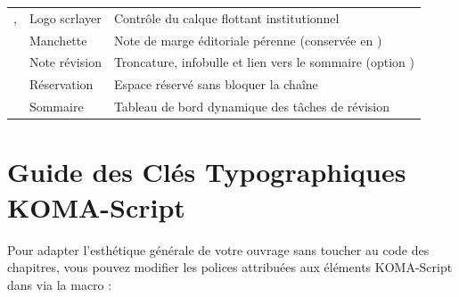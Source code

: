\begin{table}[htbp]
\begin{tabularx}{\textwidth}{@{} l l Y @{}}
    ,  & Logo scrlayer & Contrôle du calque flottant institutionnel \\
     & Manchette & Note de marge éditoriale pérenne (conservée en ) \\
     & Note révision & Troncature, infobulle et lien vers le sommaire (option ) \\
     & Réservation & Espace réservé sans bloquer la chaîne \\
     & Sommaire & Tableau de bord dynamique des tâches de révision \\
    \bottomrule
  \end{tabularx}
\end{table}

\clearpage

\section{Guide des Clés Typographiques KOMA-Script}
\label{sec:koma-font-keys}

Pour adapter l'esthétique générale de votre ouvrage sans toucher au code des chapitres,
vous pouvez modifier les polices attribuées aux éléments KOMA-Script dans 
via la macro  :

